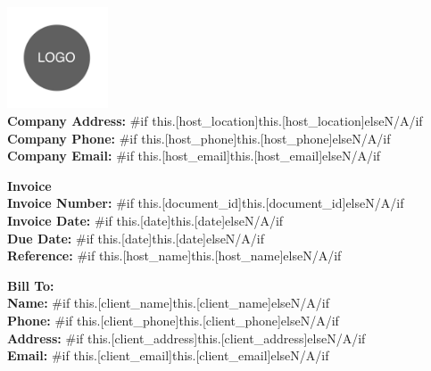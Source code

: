 \documentclass{article}
\begin{document}
\begin{minipage}[t]{0.25\textwidth}
    \vspace{0pt}
    \includegraphics[width=3cm]{aasd.jpg}\\  %
    \textbf{Company Address:} {{#if this.[host_location]}}{{this.[host_location]}}{{else}}N/A{{/if}}\\
    \textbf{Company Phone:} {{#if this.[host_phone]}}{{this.[host_phone]}}{{else}}N/A{{/if}}\\
    \textbf{Company Email:} {{#if this.[host_email]}}{{this.[host_email]}}{{else}}N/A{{/if}}
\end{minipage}%
\begin{minipage}[t]{0.75\textwidth}
    \vspace{0pt}
    \begin{flushright}
        \textbf{\LARGE Invoice}\\[10pt] %
        \textbf{Invoice Number:} {{#if this.[document_id]}}{{this.[document_id]}}{{else}}N/A{{/if}} \\
        \textbf{Invoice Date:} {{#if this.[date]}}{{this.[date]}}{{else}}N/A{{/if}} \\
        \textbf{Due Date:} {{#if this.[date]}}{{this.[date]}}{{else}}N/A{{/if}} \\%
        \textbf{Reference:} {{#if this.[host_name]}}{{this.[host_name]}}{{else}}N/A{{/if}}
    \end{flushright}
\end{minipage}

\vspace{1cm}

\noindent
\textbf{Bill To:}\\
\textbf{Name:} {{#if this.[client_name]}}{{this.[client_name]}}{{else}}N/A{{/if}} \\
\textbf{Phone:} {{#if this.[client_phone]}}{{this.[client_phone]}}{{else}}N/A{{/if}} \\
\textbf{Address:} {{#if this.[client_address]}}{{this.[client_address]}}{{else}}N/A{{/if}} \\
\textbf{Email:} {{#if this.[client_email]}}{{this.[client_email]}}{{else}}N/A{{/if}}
\end{document}
